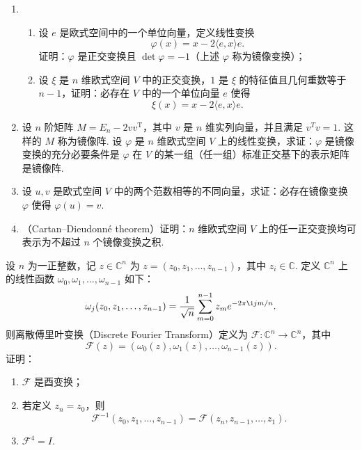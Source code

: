 \begin{exercise}
    \begin{exgroup}
        \item \label{item:24:镜像变换}
        \begin{enumerate}
            \item \begin{enumerate}
                      \item 设 $e$ 是欧式空间中的一个单位向量，定义线性变换
                            \[
                                \varphi(x) = x - 2\langle e, x \rangle e.
                            \]
                            证明：$\varphi$ 是正交变换且 $\det \varphi = -1$（上述 $\varphi$ 称为镜像变换）；
                      \item 设 $\xi$ 是 $n$ 维欧式空间 $V$ 中的正交变换，$1$ 是 $\xi$ 的特征值且几何重数等于 $n - 1$，证明：必存在 $V$ 中的一个单位向量 $e$ 使得
                            \[
                                \xi(x) = x - 2\langle e, x \rangle e.
                            \]
                  \end{enumerate}
            \item 设 $n$ 阶矩阵 $M = E_n - 2v v^{\mathrm{T}}$，其中 $v$ 是 $n$ 维实列向量，并且满足 $v^{T}v = 1$. 这样的 $M$ 称为镜像阵. 设 $\varphi$ 是 $n$ 维欧式空间 $V$ 上的线性变换，求证：$\varphi$ 是镜像变换的充分必要条件是 $\varphi$ 在 $V$ 的某一组（任一组）标准正交基下的表示矩阵是镜像阵.
            \item 设 $u, v$ 是欧式空间 $V$ 中的两个范数相等的不同向量，求证：必存在镜像变换 $\varphi$ 使得 $\varphi(u) = v$.
            \item （Cartan–Dieudonné theorem）证明：$n$ 维欧式空间 $V$ 上的任一正交变换均可表示为不超过 $n$ 个镜像变换之积.
        \end{enumerate}
        \item 设 $n$ 为一正整数，记 $z \in \mathbb{C}^n$ 为 $z = (z_0, z_1, \ldots, z_{n - 1})$，其中 $z_i \in \mathbb{C}$. 定义 $\mathbb{C}^n$ 上的线性函数 $\omega_0, \omega_1, \ldots, \omega_{n - 1}$ 如下：
        \[
            \omega_j(z_0, z_1, \ldots, z_{n - 1}) = \dfrac{1}{\sqrt{n}}\sum_{m = 0}^{n - 1}z_m e^{-2\pi \i jm/n}.
        \]
        则离散傅里叶变换（Discrete Fourier Transform）定义为 $\mathcal{F}: \mathbb{C}^n \to \mathbb{C}^n$，其中 \[ \mathcal{F}(z) = (\omega_0(z), \omega_1(z), \ldots, \omega_{n - 1}(z)). \]
        证明：
        \begin{enumerate}
            \item $\mathcal{F}$ 是酉变换；
            \item 若定义 $z_n = z_0$，则 \[ \mathcal{F}^{-1}(z_0, z_1, \ldots, z_{n - 1}) = \mathcal{F}(z_n, z_{n - 1}, \ldots, z_1). \]
            \item $\mathcal{F}^4 = I$.
        \end{enumerate}
    \end{exgroup}
\end{exercise}
